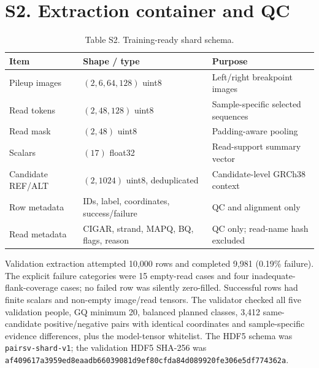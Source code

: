 \documentclass[10pt]{article}
\begin{document}
\section*{S2. Extraction container and QC}
\begin{table}[h]\centering\small
\caption{Table S2. Training-ready shard schema.}\label{tab:s2schema}
\begin{tabular}{lll}\toprule
Item & Shape / type & Purpose\\\midrule
Pileup images & $(2,6,64,128)$ uint8 & Left/right breakpoint images\\
Read tokens & $(2,48,128)$ uint8 & Sample-specific selected sequences\\
Read mask & $(2,48)$ uint8 & Padding-aware pooling\\
Scalars & $(17)$ float32 & Read-support summary vector\\
Candidate REF/ALT & $(2,1024)$ uint8, deduplicated & Candidate-level GRCh38 context\\
Row metadata & IDs, label, coordinates, success/failure & QC and alignment only\\
Read metadata & CIGAR, strand, MAPQ, BQ, flags, reason & QC only; read-name hash excluded\\\bottomrule
\end{tabular}
\end{table}

Validation extraction attempted 10,000 rows and completed 9,981 (0.19\% failure). The explicit failure categories were 15 empty-read cases and four inadequate-flank-coverage cases; no failed row was silently zero-filled. Successful rows had finite scalars and non-empty image/read tensors. The validator checked all five validation people, GQ minimum 20, balanced planned classes, 3,412 same-candidate positive/negative pairs with identical coordinates and sample-specific evidence differences, plus the model-tensor whitelist. The HDF5 schema was \texttt{pairsv-shard-v1}; the validation HDF5 SHA-256 was \texttt{af409617a3959ed8eaadb66039081d9ef80cfda84d089920fe306e5df774362a}.
\end{document}
